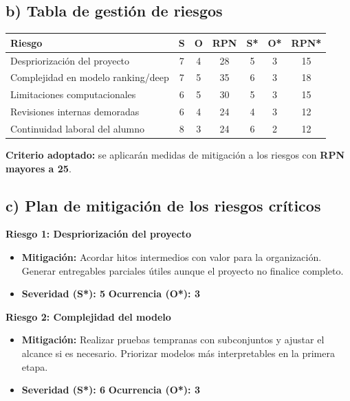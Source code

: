 \documentclass[
11pt, %
]{charter}
\begin{document}
\subsection*{b) Tabla de gestión de riesgos}

\begin{table}[htpb]
\centering
\begin{tabularx}{\linewidth}{@{}|X|c|c|c|c|c|c|@{}}
\hline
\rowcolor[HTML]{C0C0C0}
Riesgo & S & O & RPN & S* & O* & RPN* \\ \hline
Despriorización del proyecto & 7 & 4 & 28 & 5 & 3 & 15 \\ \hline
Complejidad en modelo ranking/deep & 7 & 5 & 35 & 6 & 3 & 18 \\ \hline
Limitaciones computacionales & 6 & 5 & 30 & 5 & 3 & 15 \\ \hline
Revisiones internas demoradas & 6 & 4 & 24 & 4 & 3 & 12 \\ \hline
Continuidad laboral del alumno & 8 & 3 & 24 & 6 & 2 & 12 \\ \hline
\end{tabularx}
\end{table}

\textbf{Criterio adoptado:} se aplicarán medidas de mitigación a los riesgos con \textbf{RPN mayores a 25}.

\subsection*{c) Plan de mitigación de los riesgos críticos}

\textbf{Riesgo 1: Despriorización del proyecto}
\begin{itemize}
  \item \textbf{Mitigación:} Acordar hitos intermedios con valor para la organización. Generar entregables parciales útiles aunque el proyecto no finalice completo.
  \item \textbf{Severidad (S*): 5} \quad \textbf{Ocurrencia (O*): 3}
\end{itemize}

\textbf{Riesgo 2: Complejidad del modelo}
\begin{itemize}
  \item \textbf{Mitigación:} Realizar pruebas tempranas con subconjuntos y ajustar el alcance si es necesario. Priorizar modelos más interpretables en la primera etapa.
  \item \textbf{Severidad (S*): 6} \quad \textbf{Ocurrencia (O*): 3}
\end{itemize}
\end{document}

